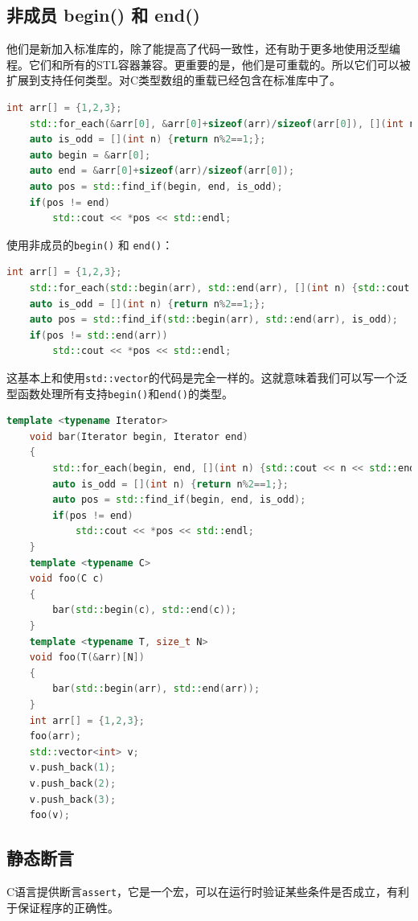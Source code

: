 \documentclass[UTF8,a4paper,12pt]{ctexbook} %
\begin{document}
		\subsection{非成员 begin() 和 end()}
			他们是新加入标准库的，除了能提高了代码一致性，还有助于更多地使用泛型编程。它们和所有的STL容器兼容。更重要的是，他们是可重载的。所以它们可以被扩展到支持任何类型。对C类型数组的重载已经包含在标准库中了。
				\begin{lstlisting}[language=C++]
	int arr[] = {1,2,3};
	std::for_each(&arr[0], &arr[0]+sizeof(arr)/sizeof(arr[0]), [](int n) {std::cout << n << std::endl;});
	auto is_odd = [](int n) {return n%2==1;};
	auto begin = &arr[0];
	auto end = &arr[0]+sizeof(arr)/sizeof(arr[0]);
	auto pos = std::find_if(begin, end, is_odd);
	if(pos != end)
		std::cout << *pos << std::endl;				
				\end{lstlisting}
				
				使用非成员的\verb|begin()| 和 \verb|end()|：
				
				\begin{lstlisting}[language=C++]
	int arr[] = {1,2,3};
	std::for_each(std::begin(arr), std::end(arr), [](int n) {std::cout << n << std::endl;});
	auto is_odd = [](int n) {return n%2==1;};
	auto pos = std::find_if(std::begin(arr), std::end(arr), is_odd);
	if(pos != std::end(arr))
		std::cout << *pos << std::endl;				
				\end{lstlisting}
				
				这基本上和使用\verb|std::vector|的代码是完全一样的。这就意味着我们可以写一个泛型函数处理所有支持\verb|begin()|和\verb|end()|的类型。
				
				\begin{lstlisting}[language=C++]
	template <typename Iterator>
	void bar(Iterator begin, Iterator end)
	{
		std::for_each(begin, end, [](int n) {std::cout << n << std::endl;});
		auto is_odd = [](int n) {return n%2==1;};
		auto pos = std::find_if(begin, end, is_odd);
		if(pos != end)
			std::cout << *pos << std::endl;
	}
	template <typename C>
	void foo(C c)
	{
		bar(std::begin(c), std::end(c));
	}
	template <typename T, size_t N>
	void foo(T(&arr)[N])
	{
		bar(std::begin(arr), std::end(arr));
	}
	int arr[] = {1,2,3};
	foo(arr);
	std::vector<int> v;
	v.push_back(1);
	v.push_back(2);
	v.push_back(3);
	foo(v);				
				\end{lstlisting}
		\subsection{静态断言}
			C语言提供断言\verb|assert|，它是一个宏，可以在运行时验证某些条件是否成立，有利于保证程序的正确性。
			
\end{document}
